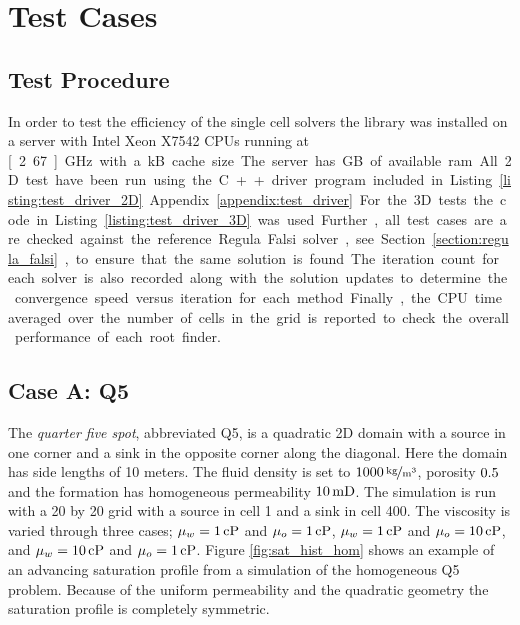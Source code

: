 \section{Test Cases}
\label{section:test_cases}

\subsection{Test Procedure}
\label{section:test_procedure}
In order to test the efficiency of the single cell solvers the \opm library was installed on a server with Intel\textregistered{}  Xeon\textregistered{}  X7542 CPUs running at \unit[2.67]{GHz} with a \unit[18432]{kB} cache size. The server has \unit[252]{GB} of available ram. All 2D test have been run using the C++ driver program included in Listing \ref{listing:test_driver_2D} Appendix \ref{appendix:test_driver}. For the 3D tests the code in Listing \ref{listing:test_driver_3D} was used. Further, all test cases are are checked against the reference Regula Falsi solver, see Section \ref{section:regula_falsi}, to ensure that the same solution is found. The iteration count for each solver is also recorded along with the solution updates to determine the  convergence speed versus iteration for each method. Finally, the CPU time averaged over the number of cells in the grid is reported to check the overall performance of each root finder.




\subsection{Case A: Q5}
\label{section:caseA}
The \emph{quarter five spot}, abbreviated Q5, is a quadratic 2D domain with a source in one corner and a sink in the opposite corner along the diagonal. Here the domain has side lengths of 10 meters. The fluid density is set to $\unitfrac[1000]{kg}{m^3}$, porosity $\unit[0.5]{}$ and the formation has homogeneous permeability $\unit[10]{mD}$. The simulation is run with a 20 by 20 grid with a source in cell 1 and a sink in cell 400. The viscosity is varied through three cases; $\mu_w = \unit[1]{cP}$ and $\mu_o= \unit[1]{cP}$, $\mu_w = \unit[1]{cP}$ and $\mu_o= \unit[10]{cP}$, and $\mu_w = \unit[10]{cP}$ and $\mu_o= \unit[1]{cP}$. Figure \ref{fig:sat_hist_hom} shows an example of an advancing saturation profile from a simulation of the homogeneous Q5 problem. Because of the uniform permeability and the quadratic geometry the saturation profile is completely symmetric.

